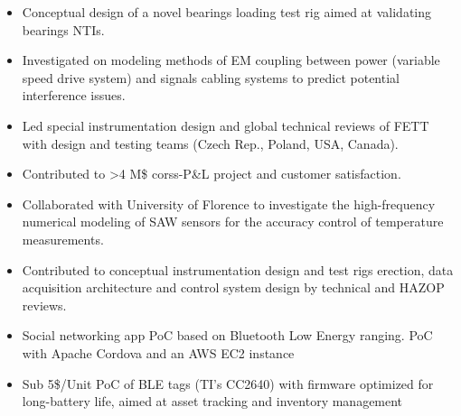 \documentclass[9pt,a4paper,ragged2e,withhyper]{altacv} %
\begin{document}
\begin{paracol}{2}

\begin{itemize}
  \item Conceptual design of a novel bearings loading test rig aimed at validating bearings NTIs. 
  \item Investigated on modeling methods of EM coupling between power (variable speed drive system) 
  and signals cabling systems to predict potential interference issues.
\end{itemize}
\divider

\begin{itemize}
  \item Led special instrumentation design and global technical reviews of FETT with design
and testing teams (Czech Rep., Poland, USA, Canada).
  \item Contributed to >4 M\$ corss-P\&L project and customer satisfaction.
\end{itemize}
\divider

\begin{itemize}
\item Collaborated with University of Florence to investigate the high-frequency numerical modeling of SAW sensors for the accuracy control of temperature measurements.
\end{itemize}
\divider

\begin{itemize}
\item Contributed to conceptual instrumentation design and test rigs erection, data
acquisition architecture and control system design by technical and HAZOP reviews.
\end{itemize}
\divider

\begin{itemize}
\item Social networking app PoC based on Bluetooth Low Energy ranging. PoC with Apache
Cordova and an AWS EC2 instance
\end{itemize}
\divider

\begin{itemize}
\item Sub 5\$/Unit PoC of BLE tags (TI's CC2640) with firmware optimized for long-battery
life, aimed at asset tracking and inventory management
\end{itemize}
\divider


\end{paracol}
\end{document}

